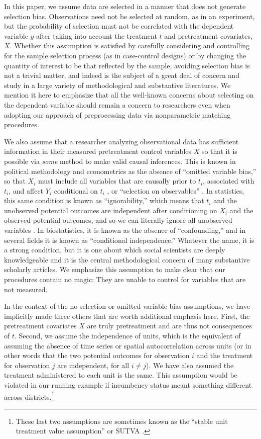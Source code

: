 \documentclass[11pt,titlepage]{article}
\begin{document}
In this paper, we assume data are selected in a manner that does not
generate selection bias.  Observations need not be selected at random,
as in an experiment, but the probability of selection must not be
correlated with the dependent variable $y$ after taking into account
the treatment $t$ and pretreatment covariates, $X$.  Whether this
assumption is satisfied by carefully considering and controlling for
the sample selection process (as in case-control designs) or by
changing the quantity of interest to be that reflected by the sample,
avoiding selection bias is not a trivial matter, and indeed is the
subject of a great deal of concern and study in a large variety of
methodological and substantive literatures.  We mention it here to
emphasize that all the well-known concerns about selecting on the
dependent variable should remain a concern to researchers even when
adopting our approach of preprocessing data via nonparametric matching
procedures.

We also assume that a researcher analyzing observational data has
sufficient information in their measured pretreatment control
variables $X$ so that it is possible via \emph{some} method to make
valid causal inferences.  This is known in political methodology and
econometrics as the absence of ``omitted variable bias,'' so that
$X_i$ must include all variables that are causally prior to $t_i$,
associated with $t_i$, and affect $Y_i$ conditional on $t_i$
\citep{Goldberger91,KinKeoVer94}, or ``selection on observables''
\citep{HecRob85}.  In statistics, this same condition is known as
``ignorability,'' which means that $t_i$ and the unobserved potential
outcomes are independent after conditioning on $X_i$ and the observed
potential outcomes, and so we can literally ignore all unobserved
variables \citep{Rubin78}.  In biostatistics, it is known as the
absence of ``confounding,'' and in several fields it is known as
``conditional independence.''  Whatever the name, it is a strong
condition, but it is one about which social scientists are deeply
knowledgeable and it is the central methodological concern of many
substantive scholarly articles.  We emphasize this assumption to make
clear that our procedures contain no magic: They are unable to control
for variables that are not measured.

In the context of the no selection or omitted variable bias
assumptions, we have implicitly made three others that are worth
additional emphasis here.  First, the pretreatment covariates $X$ are
truly pretreatment and are thus not consequences of $t$.  Second, we
assume the independence of units, which is the equivalent of assuming
the absence of time series or spatial autocorrelation across units (or
in other words that the two potential outcomes for observation $i$ and
the treatment for observation $j$ are independent, for all $i\not=j$).
We have also assumed the treatment administered to each unit is the
same.  This assumption would be violated in our running example if
incumbency status meant something different across
districts.\footnote{These last two assumptions are sometimes known as
  the ``stable unit treatment value assumption'' or SUTVA
  \citep{Rubin74}.}
\end{document}

